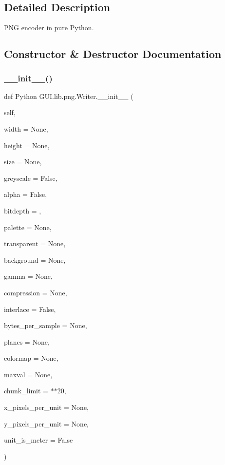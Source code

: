 \subsection{Detailed Description}
\begin{DoxyVerb}PNG encoder in pure Python.
\end{DoxyVerb}
 

\subsection{Constructor \& Destructor Documentation}
\mbox{\label{class_python_01_g_u_i_1_1lib_1_1png_1_1_writer_a5089219af230477fafe85b914e2ad278}} 
\subsubsection{\texorpdfstring{\+\_\+\+\_\+init\+\_\+\+\_\+()}{\_\_init\_\_()}}
{\footnotesize\ttfamily def Python G\+U\+I.\+lib.\+png.\+Writer.\+\_\+\+\_\+init\+\_\+\+\_\+ (\begin{DoxyParamCaption}\item[{}]{self,  }\item[{}]{width = {\ttfamily None},  }\item[{}]{height = {\ttfamily None},  }\item[{}]{size = {\ttfamily None},  }\item[{}]{greyscale = {\ttfamily False},  }\item[{}]{alpha = {\ttfamily False},  }\item[{}]{bitdepth = {},  }\item[{}]{palette = {\ttfamily None},  }\item[{}]{transparent = {\ttfamily None},  }\item[{}]{background = {\ttfamily None},  }\item[{}]{gamma = {\ttfamily None},  }\item[{}]{compression = {\ttfamily None},  }\item[{}]{interlace = {\ttfamily False},  }\item[{}]{bytes\+\_\+per\+\_\+sample = {\ttfamily None},  }\item[{}]{planes = {\ttfamily None},  }\item[{}]{colormap = {\ttfamily None},  }\item[{}]{maxval = {\ttfamily None},  }\item[{}]{chunk\+\_\+limit = {$\ast$$\ast$20},  }\item[{}]{x\+\_\+pixels\+\_\+per\+\_\+unit = {\ttfamily None},  }\item[{}]{y\+\_\+pixels\+\_\+per\+\_\+unit = {\ttfamily None},  }\item[{}]{unit\+\_\+is\+\_\+meter = {\ttfamily False} }\end{DoxyParamCaption})}

